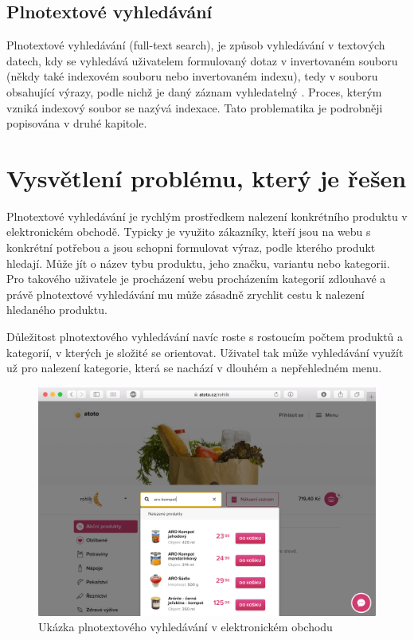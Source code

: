\documentclass[FM,DP]{tulthesis}
\begin{document}
\subsection*{Plnotextové vyhledávání}

Plnotextové vyhledávání (full-text search), je způsob vyhledávání v textových datech, 
kdy se vyhledává uživatelem formulovaný dotaz v invertovaném souboru (někdy také 
indexovém souboru nebo invertovaném indexu), tedy v souboru obsahující výrazy, 
podle nichž je daný záznam vyhledatelný \cite[strana~15]{strossa}. 
Proces, kterým vzniká indexový soubor se nazývá indexace. Tato problematika je podrobněji
popisována v druhé kapitole.

\section{Vysvětlení problému, který je řešen}

Plnotextové vyhledávání je rychlým prostředkem nalezení konkrétního produktu
v elektronickém obchodě. Typicky je využito zákazníky, kteří jsou na webu
s konkrétní potřebou a jsou schopni formulovat výraz, podle kterého produkt
hledají. Může jít o název tybu produktu, jeho značku, variantu nebo kategorii.
Pro takového uživatele je procházení webu procházením kategorií zdlouhavé
a právě plnotextové vyhledávání mu může zásadně zrychlit cestu k nalezení 
hledaného produktu.

Důležitost plnotextového vyhledávání navíc roste s rostoucím počtem produktů a kategorií, 
v kterých je složité se orientovat. Uživatel tak může vyhledávání využít už pro 
nalezení kategorie, která se nachází v dlouhém a nepřehledném menu.

\begin{figure}[h]
\center
\includegraphics[width=\textwidth]{atoto-vyhledavani.png}
\caption{Ukázka plnotextového vyhledávání v elektronickém obchodu}
\label{atoto-vyhledavani}
\end{figure}
\end{document}
